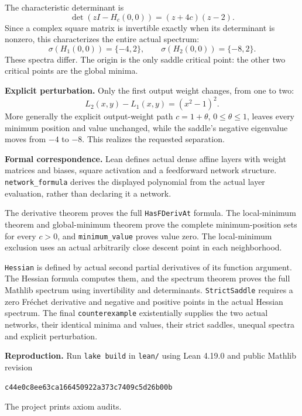 \documentclass[11pt]{article}
\begin{document}
The characteristic determinant is
\[
 \det(zI-H_c(0,0))=(z+4c)(z-2).
\]
Since a complex square matrix is invertible exactly when its
determinant is nonzero, this characterizes the entire actual
spectrum:
\[
 \sigma(H_1(0,0))=\{-4,2\},\qquad
 \sigma(H_2(0,0))=\{-8,2\}.
\]
These spectra differ. The origin is the only saddle critical
point: the other two critical points are the global minima.

\textbf{Explicit perturbation.}
Only the first output weight changes, from one to two:
\[
 L_2(x,y)-L_1(x,y)=(x^2-1)^2.
\]
More generally the explicit output-weight path $c=1+\theta$,
$0\leq\theta\leq1$, leaves every minimum position and value
unchanged, while the saddle's negative eigenvalue moves
from $-4$ to $-8$. This realizes the requested separation.

\textbf{Formal correspondence.}
Lean defines actual dense affine layers with weight matrices and
biases, square activation and a feedforward network structure.
\texttt{network\_formula} derives the displayed polynomial from
the actual layer evaluation, rather than declaring it a network.

The derivative theorem proves the full \texttt{HasFDerivAt}
formula. The local-minimum theorem and
global-minimum theorem prove the complete minimum-position
sets for every $c>0$, and \texttt{minimum\_value} proves value zero.
The local-minimum exclusion uses an actual arbitrarily close
descent point in each neighborhood.

\texttt{Hessian} is defined by actual second partial derivatives
of its function argument. The Hessian formula computes them,
and the spectrum theorem proves the full Mathlib spectrum
using invertibility and determinants.
\texttt{StrictSaddle} requires a zero Fr\'echet derivative and
negative and positive points in the actual Hessian spectrum.
The final \texttt{counterexample} existentially supplies the
two actual networks, their identical minima and values,
their strict saddles, unequal spectra and explicit perturbation.

\textbf{Reproduction.}
Run \texttt{lake build} in \texttt{lean/} using Lean 4.19.0 and
public Mathlib revision
\begin{center}\small\texttt{c44e0c8ee63ca166450922a373c7409c5d26b00b}\end{center}
The project prints axiom audits.
\end{document}
